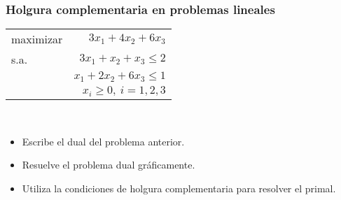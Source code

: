 \documentclass{beamer}
\begin{document}
\begin{frame}
\frametitle{Holgura complementaria en problemas lineales}

\begin{center}
\begin{tabular}{lr}
maximizar & $3x_1 + 4x_2 + 6x_3$ \\
s.a. & $3x_1+x_2 + x_3 \leq 2$    \\
	 & $x_1 + 2x_2 + 6x_3 \leq 1$  \\
	 & $x_i\geq 0,\ i=1,2,3$
\end{tabular}
\end{center}


\


\begin{itemize}
\item Escribe el dual del problema anterior.
\item Resuelve el problema dual gráficamente.
\item Utiliza la condiciones de holgura complementaria para resolver el primal.
\end{itemize}


\end{frame}
\end{document}
